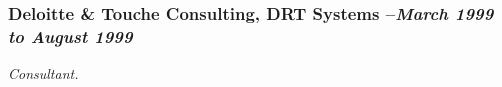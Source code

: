 \documentclass[10pt]{report}
\begin{document}
%
%
%
%
%
%
%
%
%
%
%
  \subsubsection*{Deloitte \& Touche Consulting, DRT Systems --\emph{March 1999
  to August 1999}}
    \emph{Consultant.}
\end{document}
